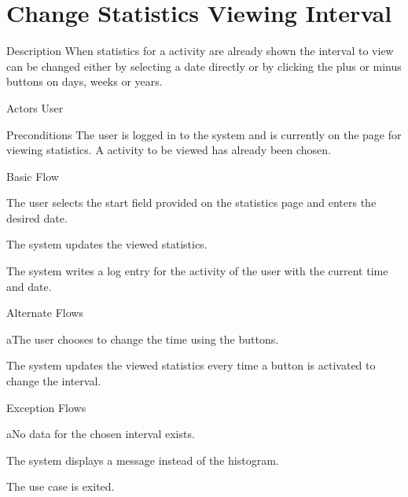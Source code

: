 \section{Change Statistics Viewing Interval}

%
\begin{cpart}{Description}
When statistics for a activity are already shown the interval to view can be changed either by selecting a date directly or by clicking the plus or minus buttons on days, weeks or years.
\end{cpart}


%
\begin{cpart}{Actors}
User
\end{cpart}

%
\begin{cpart}{Preconditions}
The user is logged in to the system and is currently on the page for viewing statistics. A activity to be viewed has already been chosen.
\end{cpart}

%
\begin{cpartList}{Basic Flow}
  \item The user selects the start field provided on the statistics page and enters the desired date.
  \item The system updates the viewed statistics.
    \item The system writes a log entry for the activity of the user with the current time and date.
\end{cpartList}

%
\begin{cpartList}{Alternate Flows}
  \begin{innerList}{1}{a}{The user chooses to change the time using the buttons.}
    \item The system updates the viewed statistics every time a button is activated to change the interval.
  \end{innerList}
\end{cpartList}

%
\begin{cpartList}{Exception Flows}
  \begin{innerList}{4}{a}{No data for the chosen interval exists.}
    \item The system displays a message instead of the histogram.
    \item The use case is exited.
  \end{innerList}
\end{cpartList}

\clearpage

